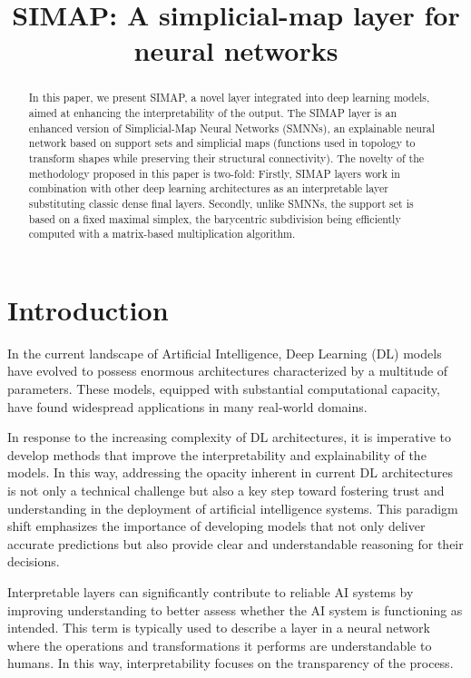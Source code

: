 
\title{SIMAP: A simplicial-map layer for neural networks}
\maketitle

\begin{abstract}
In this paper, we present SIMAP, a novel layer integrated into deep learning models, aimed at enhancing 
the interpretability of the output.
The SIMAP layer is an enhanced version of Simplicial-Map Neural Networks (SMNNs), an 
explainable neural network based on support sets and simplicial maps (functions 
 used in topology to transform shapes while preserving their structural connectivity).
The novelty of the methodology proposed in this paper is two-fold: 
Firstly, SIMAP layers work in combination with other deep learning architectures as an interpretable layer substituting classic dense final layers. 
Secondly, unlike SMNNs,
the support set is based on a fixed maximal simplex, the barycentric subdivision being efficiently computed with a matrix-based multiplication algorithm.
\end{abstract}

\section{Introduction}
In the current landscape of Artificial Intelligence, Deep Learning (DL) models have evolved to possess enormous architectures characterized by a multitude of parameters. These models, equipped with substantial computational capacity, have found widespread applications in many real-world domains.

In response to the increasing complexity of DL architectures, it is imperative to develop methods that improve the interpretability and explainability of the models.
In this way, addressing the opacity inherent in current DL architectures is not only a technical challenge but also a key step toward fostering trust and understanding in the deployment of artificial intelligence systems. This paradigm shift emphasizes the importance of developing models that not only deliver accurate predictions but also provide clear and understandable reasoning for their decisions.

Interpretable layers can significantly contribute to reliable AI systems by improving understanding to better assess whether the AI system is functioning as intended.
This term is typically used to describe a layer in a neural network where the operations and transformations it performs are understandable to humans. In this way, interpretability focuses on the transparency of the process.

